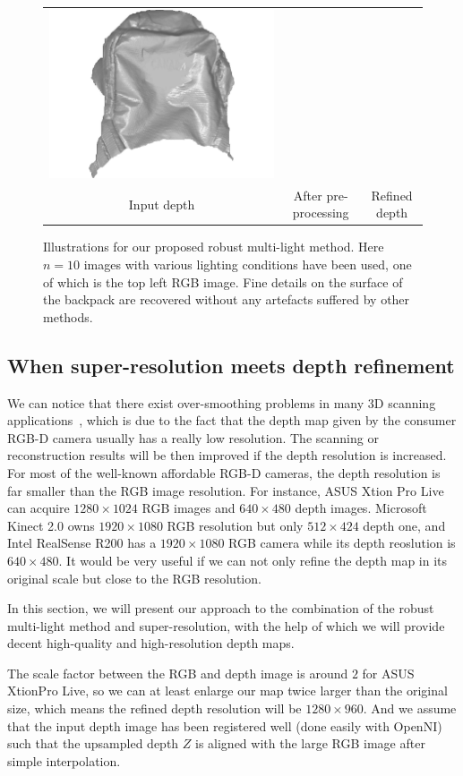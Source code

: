 \begin{figure}[!ht]
{\begin{tabular}{c| c c}
   \includegraphics[height = 0.25\linewidth]{figures/methodology/robust_backpack_shape.pdf}\\
{Input depth} & {After pre-processing} & {Refined depth}
 \end{tabular}}
\caption{Illustrations for our proposed robust multi-light method. Here $n = 10$ images with various lighting conditions have been used, one of which is the top left RGB image. Fine details on the surface of the backpack are recovered without any artefacts suffered by other methods.}
\label{fig:robust_illustration}
\end{figure}




\subsection{When super-resolution meets depth refinement}
We can notice that there exist over-smoothing problems in many 3D scanning applications~\cite{sturm_etal_2013gcpr}, which is due to the fact that the depth map given by the consumer RGB-D camera usually has a really low resolution.
The scanning or reconstruction results will be then improved if the depth resolution is increased.
For most of the well-known affordable RGB-D cameras, the depth resolution is far smaller than the RGB image resolution.
For instance, ASUS Xtion Pro Live can acquire $1280\times 1024$ RGB images and $640\times 480$ depth images. Microsoft Kinect 2.0 owns $1920\times1080$ RGB resolution but only $512\times424$ depth one, and Intel RealSense R200 has a $1920\times1080$ RGB camera while its depth reoslution is $640\times 480$.
It would be very useful if we can not only refine the depth map in its original scale but close to the RGB resolution.  

In this section, we will present our approach to the combination of the robust multi-light method and super-resolution, with the help of which we will provide decent high-quality and high-resolution depth maps. 

The scale factor between the RGB and depth image is around $2$ for ASUS XtionPro Live, so we can at least enlarge our map twice larger than the original size, which means the refined depth resolution will be $1280\times960$.
 And we assume that the input depth image has been registered well (done easily with OpenNI) such that the upsampled depth $Z$ is aligned with the large RGB image after simple interpolation.

